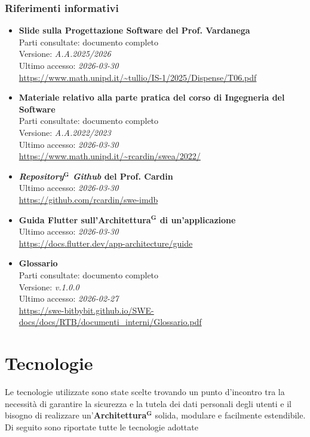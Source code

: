 \documentclass[a4paper,12pt]{article}
\newcommand{\term}[1]{\textbf{#1}$^\mathbf{G}$}
\begin{document}
\subsubsection{Riferimenti informativi} \label{sec:riferimenti_informativi}
\begin{itemize}
    \item \textbf{Slide sulla Progettazione Software del Prof. Vardanega}\\
        Parti consultate: documento completo\\
        Versione: \textit{A.A.2025/2026}\\
        Ultimo accesso: \textit{2026-03-30}\\
        \url{https://www.math.unipd.it/~tullio/IS-1/2025/Dispense/T06.pdf}
    \item \textbf{Materiale relativo alla parte pratica del corso di Ingegneria del Software}\\
        Parti consultate: documento completo\\
        Versione: \textit{A.A.2022/2023}\\
        Ultimo accesso: \textit{2026-03-30}\\
        \url{https://www.math.unipd.it/~rcardin/swea/2022/}
    \item \textbf{\emph{\term{Repository} Github} del Prof. Cardin}\\
        Ultimo accesso: \textit{2026-03-30}\\
        \url{https://github.com/rcardin/swe-imdb}
    \item \textbf{Guida Flutter sull'\term{Architettura} di un'applicazione}\\
        Ultimo accesso: \textit{2026-03-30}\\
        \url{https://docs.flutter.dev/app-architecture/guide} 
    \item \textbf{Glossario}\\
        Parti consultate: documento completo\\
        Versione: \textit{v.1.0.0}\\
        Ultimo accesso: \textit{2026-02-27}\\
        \url{https://swe-bitbybit.github.io/SWE-docs/docs/RTB/documenti_interni/Glossario.pdf}
\end{itemize}

\section{Tecnologie} \label{sec:tecnologie}
Le tecnologie utilizzate sono state scelte trovando un punto d'incontro tra la necessità di garantire la sicurezza e la tutela dei dati personali degli utenti e il bisogno di realizzare un'\term{Architettura} solida, modulare e facilmente estendibile. Di seguito sono riportate tutte le tecnologie adottate 
\end{document}
